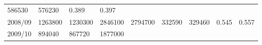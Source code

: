 \documentclass[
  spanish,
]{article}
\begin{document}
\begin{longtable}[]{@{}lllllllll@{}}
\begin{minipage}[t]{0.08\columnwidth}
586530\strut
\end{minipage} & \begin{minipage}[t]{0.09\columnwidth}\raggedright
576230\strut
\end{minipage} & \begin{minipage}[t]{0.08\columnwidth}\raggedright
0.389\strut
\end{minipage} & \begin{minipage}[t]{0.09\columnwidth}\raggedright
0.397\strut
\end{minipage}\tabularnewline
\begin{minipage}[t]{0.06\columnwidth}\raggedright
2008/09\strut
\end{minipage} & \begin{minipage}[t]{0.09\columnwidth}\raggedright
1263800\strut
\end{minipage} & \begin{minipage}[t]{0.10\columnwidth}\raggedright
1230300\strut
\end{minipage} & \begin{minipage}[t]{0.09\columnwidth}\raggedright
2846100\strut
\end{minipage} & \begin{minipage}[t]{0.10\columnwidth}\raggedright
2794700\strut
\end{minipage} & \begin{minipage}[t]{0.08\columnwidth}\raggedright
332590\strut
\end{minipage} & \begin{minipage}[t]{0.09\columnwidth}\raggedright
329460\strut
\end{minipage} & \begin{minipage}[t]{0.08\columnwidth}\raggedright
0.545\strut
\end{minipage} & \begin{minipage}[t]{0.09\columnwidth}\raggedright
0.557\strut
\end{minipage}\tabularnewline
\begin{minipage}[t]{0.06\columnwidth}\raggedright
2009/10\strut
\end{minipage} & \begin{minipage}[t]{0.09\columnwidth}\raggedright
894040\strut
\end{minipage} & \begin{minipage}[t]{0.10\columnwidth}\raggedright
867720\strut
\end{minipage} & \begin{minipage}[t]{0.09\columnwidth}\raggedright
1877000\strut

\end{minipage}
\end{longtable}
\end{document}
